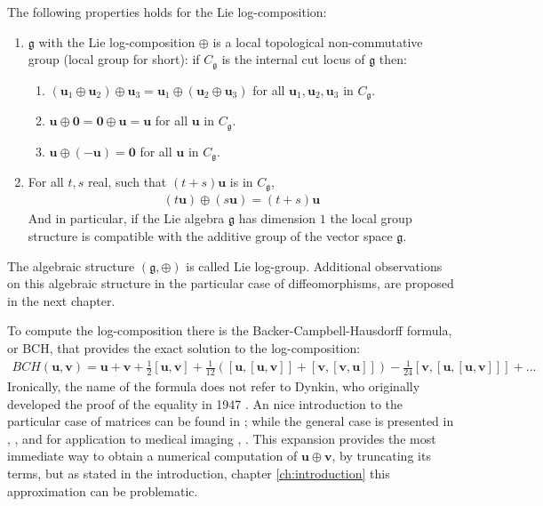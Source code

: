 \noindent
The following properties holds for the Lie log-composition:
\begin{enumerate}
	\item $\mathfrak{g} $ with the Lie log-composition $\oplus$ is a local topological non-commutative group (local group for short): if $C_{\mathfrak{g}}$ is the internal cut locus of $\mathfrak{g}$ then:
	\begin{enumerate}
		\item $(\mathbf{u}_{1}\oplus\mathbf{u}_{2}) \oplus \mathbf{u}_{3}
		= \mathbf{u}_{1}\oplus(\mathbf{u}_{2} \oplus \mathbf{u}_{3})$ for all $\mathbf{u}_{1}, \mathbf{u}_{2}, \mathbf{u}_{3}$ in $C_{\mathfrak{g}}$.
		\item $\mathbf{u}\oplus\mathbf{0}  = \mathbf{0}\oplus\mathbf{u} = \mathbf{u}$ for all $\mathbf{u}$ in $C_{\mathfrak{g}}$.
		\item $\mathbf{u}\oplus(-\mathbf{u} ) = \mathbf{0}$ for all $\mathbf{u}$ in $C_{\mathfrak{g}}$.
	\end{enumerate}
	\item For all $t,s$ real, such that $(t+s)\mathbf{u}$ is in $C_{\mathfrak{g}}$,
	\begin{align*}
	(t\mathbf{u})\oplus (s\mathbf{u}) = (t+s)\mathbf{u}
	\end{align*}
	And in particular, if the Lie algebra $\mathfrak{g}$ has dimension $1$ the local group structure is compatible with the additive group of the vector space $\mathfrak{g}$.
\end{enumerate}

\noindent
The algebraic structure $(\mathfrak{g} , \oplus)$ is called Lie log-group. Additional observations on this algebraic structure in the particular case of diffeomorphisms, are proposed in the next chapter.

To compute the log-composition there is the Backer-Campbell-Hausdorff formula, or BCH,
that provides the exact solution to the log-composition: 
\begin{align*}
BCH(\mathbf{u},\mathbf{v}) 
= 
\mathbf{u} + \mathbf{v} + \frac{1}{2}[\mathbf{u},\mathbf{v}] + \frac{1}{12}([\mathbf{u},[\mathbf{u},\mathbf{v}]]
+ [\mathbf{v},[\mathbf{v},\mathbf{u}]]) - \frac{1}{24}[\mathbf{v},[\mathbf{u},[\mathbf{u},\mathbf{v}]]] +... 
\end{align*}
Ironically, the name of the formula does not refer to Dynkin, who originally developed the proof of the equality in 1947 \cite{dynkin1947calculation}. An nice introduction to the particular case of matrices can be found in \cite{hall2015lie}; while the general case is presented in \cite{klarsfeld1989baker}, \cite{serre2009lie}, and for application to medical imaging \cite{lorenzi2014efficient}, \cite{vercauteren08}.
This expansion provides the most immediate way to obtain a numerical computation of $\mathbf{u}\oplus \mathbf{v}$, by truncating its terms, but as stated in the introduction, chapter \ref{ch:introduction} this approximation can be problematic.

